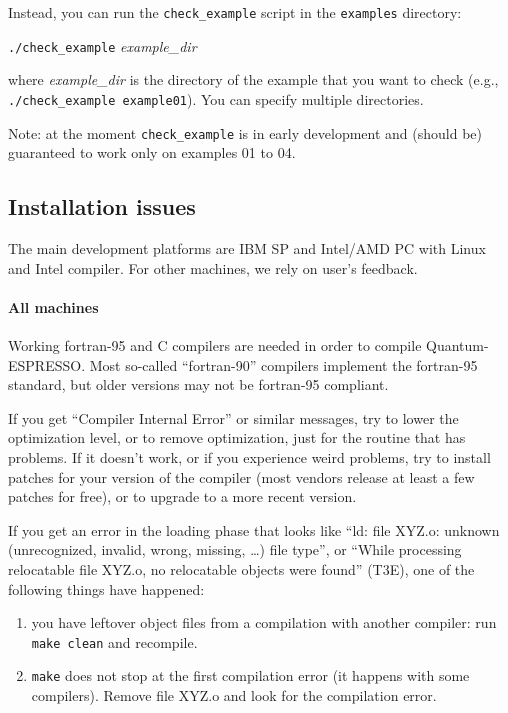 \documentclass[12pt,a4paper]{article}
\begin{document}
\begin{enumerate}
Instead, you can run the \texttt{check\_example} script in the
\texttt{examples} directory:
\medskip

\quad\texttt{./check\_example} \emph{example\_dir}
\medskip

\noindent
where \emph{example\_dir} is the directory of the example that you
want to check (e.g., \texttt{./check\_example example01}).
You can specify multiple directories.

Note: at the moment \texttt{check\_example} is in early development
and (should be) guaranteed to work only on examples 01 to 04.
\end{enumerate}

\subsection{Installation issues}
  \label{installissues}

The main development platforms are IBM SP and Intel/AMD PC with Linux
and Intel compiler.  For other machines, we rely on user's feedback.

\paragraph{All machines}

Working fortran-95 and C compilers are needed in order to compile 
Quantum-ESPRESSO. Most so-called ``fortran-90'' compilers implement the 
fortran-95 standard, but older versions may not be fortran-95
compliant.

If you get ``Compiler Internal Error'' or similar messages, try to
lower the optimization level, or to remove optimization, just for the
routine that has problems.  If it doesn't work, or if you experience
weird problems, try to install patches for your version of the
compiler (most vendors release at least a few patches for free), or to
upgrade to a more recent version.

If you get an error in the loading phase that looks like ``ld: file
XYZ.o: unknown (unrecognized, invalid, wrong, missing, \dots) file
type'', or ``While processing relocatable file XYZ.o, no relocatable
objects were found'' (T3E), one of the following things have happened:

\begin{enumerate}
  \item you have leftover object files from a compilation with another 
        compiler: run \texttt{make clean} and recompile.
  \item \texttt{make} does not stop at the first compilation error (it
        happens with some compilers).
        Remove file XYZ.o and look for the compilation error.
\end{enumerate}
\end{document}
